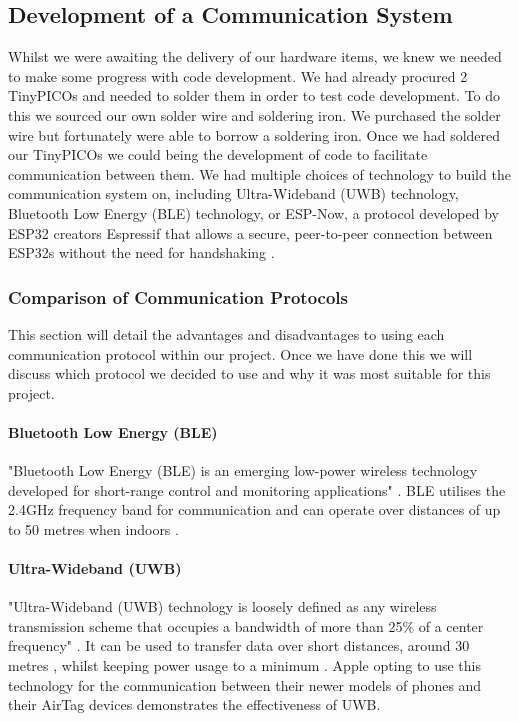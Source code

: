 {\subsection{Development of a Communication System}

Whilst we were awaiting the delivery of our hardware items, we knew we needed to make some progress with code development. We had already procured 2 TinyPICOs and needed to solder them in order to test code development. To do this we sourced our own solder wire and soldering iron. We purchased the solder wire but fortunately were able to borrow a soldering iron. Once we had soldered our TinyPICOs we could being the development of code to facilitate communication between them. We had multiple choices of technology to build the communication system on, including Ultra-Wideband (UWB) technology, Bluetooth Low Energy (BLE) technology, or ESP-Now, a protocol developed by ESP32 creators Espressif that allows a secure, peer-to-peer connection between ESP32s without the need for handshaking \cite{esp-now_overview}.

\subsubsection{Comparison of Communication Protocols}

This section will detail the advantages and disadvantages to using each communication protocol within our project. Once we have done this we will discuss which protocol we decided to use and why it was most suitable for this project.

\paragraph{Bluetooth Low Energy (BLE)}

"Bluetooth Low Energy (BLE) is an emerging low-power wireless technology developed for short-range control and monitoring applications" \cite{gomez_oller_paradells_2012}. BLE utilises the 2.4GHz frequency band for communication and can operate over distances of up to 50 metres when indoors \cite{ble_adv_dis}.



\paragraph{Ultra-Wideband (UWB)}

"Ultra-Wideband (UWB) technology is loosely defined as any wireless transmission scheme that occupies a bandwidth of more than 25\% of a center frequency" \cite{Foerster_ultra-widebandtechnology}. It can be used to transfer data over short distances, around 30 metres \cite{uwb_adv_dis}, whilst keeping power usage to a minimum \cite{uwb}. Apple opting to use this technology for the communication between their newer models of phones and their AirTag devices demonstrates the effectiveness of UWB.

}
